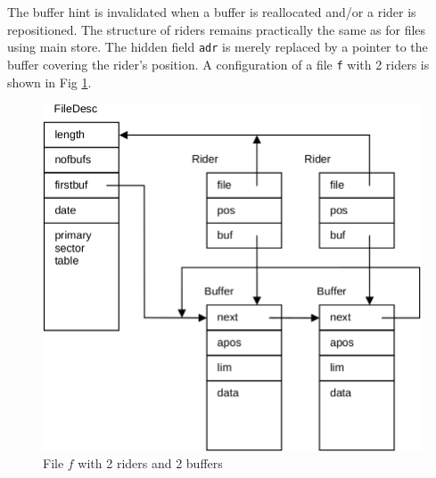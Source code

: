 \begin{enumerate}
    The buffer hint is invalidated when a buffer is reallocated and/or a rider is repositioned.  The
    structure of riders remains practically the same as for files using main store. The hidden field
    \verb|adr| is merely replaced by a pointer to the buffer covering the rider's position. A
    configuration of a file \verb|f| with 2 riders is shown in Fig \ref{fig:file}.
    \begin{figure}
      \flushright
      \includegraphics[width=.9\textwidth]{i/m}
      \caption{File $f$ with 2 riders and 2 buffers}
      \label{fig:file}
    \end{figure}
\end{enumerate}

